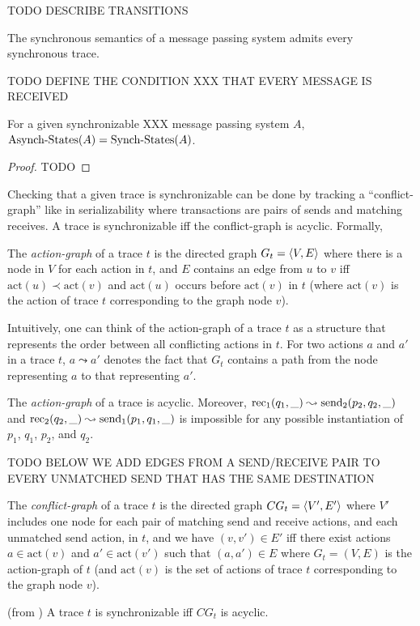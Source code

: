 TODO DESCRIBE TRANSITIONS 

\begin{lemma}\label{lem:sync_traces}
The synchronous semantics of a message passing system admits every synchronous trace.
\end{lemma}

TODO DEFINE THE CONDITION XXX THAT EVERY MESSAGE IS RECEIVED

\begin{lemma}
For a given synchronizable XXX message passing system $A$, $\mathrm{Asynch}\text{-}\mathrm{States}(A)=\mathrm{Synch}\text{-}\mathrm{States}(A)$.
\end{lemma}
\begin{proof}
TODO 
\end{proof}

Checking that a given trace is synchronizable can be done by tracking a ``conflict-graph'' like in serializability 
where transactions are pairs of sends and matching receives. 
A trace is synchronizable if{f} the conflict-graph is acyclic. Formally,

\begin{definition}\label{def:pr_graphs}
    The \emph{action-graph} of a trace $t$ is the directed graph 
    $G_t = \left\langle {V,E} \right\rangle$ where there is a node in $V$ for each action in $t$, and $E$ 
    contains an edge from $u$ to $v$ iff $\mathrm{act}(u) \prec \mathrm{act}(v)$ and $\mathrm{act}(u)$ occurs before $\mathrm{act}(v)$ in $t$ (where $\mathrm{act}(v)$ is the action of trace $t$ corresponding to the graph node $v$).
\end{definition}
Intuitively, one can think of the action-graph of a trace $t$ as a structure that represents the order between all conflicting actions in $t$.
For two actions $a$ and $a'$ in a trace $t$, $a\leadsto a'$ denotes the fact that $G_t$ contains a path from the node representing $a$ to that representing $a'$.

\begin{lemma}\label{lem:acyclic_ag}
	The \emph{action-graph} of a trace is acyclic. Moreover, $\mathrm{rec}_{1}({q_1,\_})\leadsto \mathrm{send}_{2}({p_2,q_2,\_})$ and $\mathrm{rec}_{2}({q_2,\_})\leadsto \mathrm{send}_{1}({p_1,q_1,\_})$ is impossible for any possible instantiation of $p_1$, $q_1$, $p_2$, and $q_2$.
\end{lemma}

TODO BELOW WE ADD EDGES FROM A SEND/RECEIVE PAIR TO EVERY UNMATCHED SEND THAT HAS THE SAME DESTINATION

\begin{definition}\label{def:conf_graph}
    The \emph{conflict-graph} of a trace $t$ is the directed graph $CG_t=\left\langle {V',E'} \right\rangle$ where $V'$ includes one node for each pair of matching send and receive actions, and each unmatched send action, in $t$, and we have $(v,v') \in E'$ iff there exist actions $a \in \mathrm{act}(v)$ and $a' \in \mathrm{act}(v')$ such that $(a,a') \in E$ where $G_t = (V,E)$ is the action-graph of $t$ (and $\mathrm{act}(v)$ is the set of actions of trace $t$ corresponding to the graph node $v$).
\end{definition}



\begin{theorem}\label{thm:cg} (from \citep{journals/jacm/Papadimitriou79b})
A trace $t$ is synchronizable if{f} $CG_t$ is acyclic.
\end{theorem}



